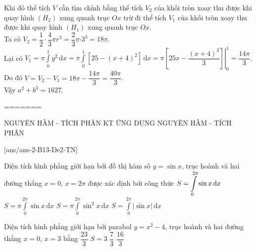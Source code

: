 \begin{ex}
{{
}
\noindent Khi đó thể tích $V$ cần tìm chính bằng thể tích $V_2$ của khối tròn xoay thu được khi quay hình $\left(H_2\right)$ xung quanh trục $Ox$ trừ đi thể tích $V_1$ của khối tròn xoay thu được khi quay hình $\left(H_1\right)$ xung quanh trục $Ox$.\\
Ta có $V_2=\dfrac{1}{2}\cdot \dfrac{4}{3}\pi r^3=\dfrac{2}{3}\pi {\cdot 3^3}=18\pi$.\\
Lại có $V_1=\pi\displaystyle\int\limits_0^1y^2\mathrm{\,d}x=\pi\displaystyle\int\limits_0^1\left[25-\left(x+4\right)^2\right]\mathrm{\,d}x=\left.\pi \left[25x-\dfrac{\left(x+4\right)^3}{3}\right]\right|_0^1
=\dfrac{14\pi}{3}$.\\
Do đó $V=V_2-V_1=18\pi-\dfrac{14\pi}{3}=\dfrac{40\pi}{3}$.\\
Vậy $a^2+b^3=1627$.
}
\end{ex}
=======
\begin{name}
	{NGUYÊN HÀM - TÍCH PHÂN}
	{KT ỨNG DỤNG NGUYÊN HÀM - TÍCH PHÂN}
	{\tentruong}
	{\thoigian}
\end{name}
\setcounter{ex}{0}\setcounter{bt}{0}
[ans/ans-2-B13-De2-TN]
\TN
\begin{ex}%
Diện tích hình phẳng giới hạn bởi đồ thị hàm số $y=\sin x$, trục hoành và hai đường thẳng $x=0$, $x=2\pi$ được xác định bởi công thức
	\choice
	{$S=\displaystyle\displaystyle\int\limits_0^{2\pi}\sin x\mathrm{\,d}x$}
	{$S=\pi\displaystyle\int\limits_0^{2\pi}\sin x\mathrm{\,d}x$}
	{$S=\pi\displaystyle\int\limits_0^{2\pi}\sin^2 x\mathrm{\,d}x$}
	{\True $S=\displaystyle\int\limits_0^{2\pi}\left| \sin x \right|\mathrm{\,d}x$}
\end{ex}
\begin{ex}%
Diện tích hình phẳng giới hạn bởi parabol $y=x^2-4$, trục hoành và hai đường thẳng $x=0$, $x=3$ bằng
	\choice
	{\True $\dfrac{23}{3}$}
	{$S=3$}
	{$\dfrac{7}{3}$}
	{$\dfrac{16}{3}$}
\end{ex}
